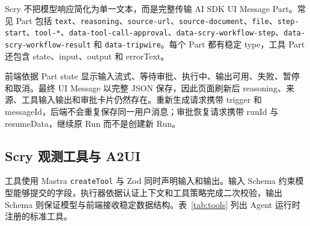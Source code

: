 \documentclass[conference,10pt]{IEEEtran}
\newcommand{\code}[1]{\texttt{#1}}
\begin{document}
Scry 不把模型响应简化为单一文本，而是完整传输 AI SDK UI Message Part。常见 Part 包括 \code{text}、\code{reasoning}、\code{source-url}、\code{source-document}、\code{file}、\code{step-start}、\code{tool-*}、\code{data-tool-call-approval}、\code{data-scry-workflow-step}、\code{data-scry-workflow-result} 和 \code{data-tripwire}。每个 Part 都有稳定 type，工具 Part 还包含 state、input、output 和 errorText。

前端依据 Part state 显示输入流式、等待审批、执行中、输出可用、失败、暂停和取消。最终 UI Message 以完整 JSON 保存，因此页面刷新后 reasoning、来源、工具输入输出和审批卡片仍然存在。重新生成请求携带 trigger 和 messageId，后端不会重复保存同一用户消息；审批恢复请求携带 runId 与 resumeData，继续原 Run 而不是创建新 Run。

\subsection{Scry 观测工具与 A2UI}

工具使用 Mastra \code{createTool} 与 Zod 同时声明输入和输出。输入 Schema 约束模型能够提交的字段，执行器依据认证上下文和工具策略完成二次校验，输出 Schema 则保证模型与前端接收稳定数据结构。表~\ref{tab:tools} 列出 Agent 运行时注册的标准工具。
\end{document}
